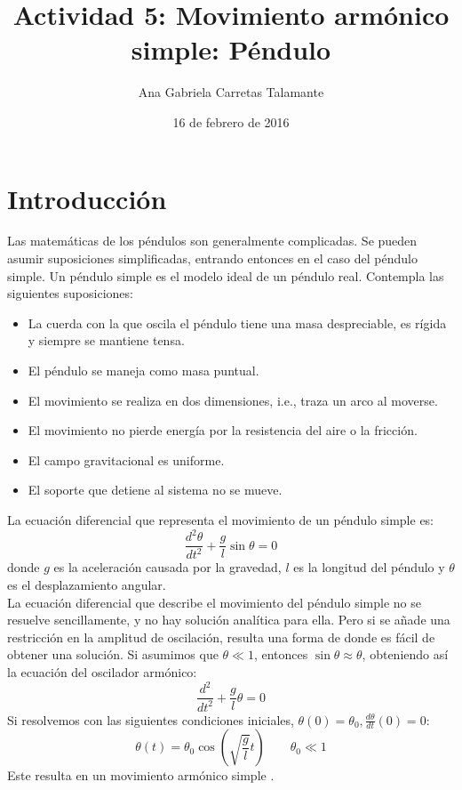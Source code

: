 \documentclass[12pt]{article}
\title{Actividad 5: Movimiento armónico simple: Péndulo}
\author{Ana Gabriela Carretas Talamante}
\date{16 de febrero de 2016}
\begin{document}
\maketitle
\section{Introducción}
Las matemáticas de los péndulos son generalmente complicadas. Se pueden asumir suposiciones simplificadas, entrando entonces en el caso del péndulo simple. Un péndulo simple es el modelo ideal de un péndulo real. Contempla las siguientes suposiciones:
\begin{itemize}
\item La cuerda con la que oscila el péndulo tiene una masa despreciable, es rígida y siempre se mantiene tensa.
\item El péndulo se maneja como masa puntual.
\item El movimiento se realiza en dos dimensiones, i.e., traza un arco al moverse.
\item El movimiento no pierde energía por la resistencia del aire o la fricción.
\item El campo gravitacional es uniforme.
\item El soporte que detiene al sistema no se mueve.
\end{itemize}
La ecuación diferencial que representa el movimiento de un péndulo simple es:
\begin{equation}
\label{1}
\frac{d^2\theta}{dt^2} + \frac{g}{l}\sin\theta=0
\end{equation}
donde $g$ es la aceleración causada por la gravedad, $l$ es la longitud del péndulo y $\theta$ es el desplazamiento angular. \\

La ecuación diferencial que describe el movimiento del péndulo simple no se resuelve sencillamente, y no hay solución analítica para ella. Pero si se añade una restricción en la amplitud de oscilación, resulta una forma de donde es fácil de obtener una solución. Si asumimos que $\theta \ll 1$, entonces $\sin\theta\approx\theta$, obteniendo así la ecuación del oscilador armónico:
\begin{equation}
\frac{d^2}{dt^2}+\frac{g}{l}\theta=0
\end{equation}
Si resolvemos con las siguientes condiciones iniciales, $\theta(0)=\theta_0, \frac{d\theta}{dt}(0)=0$:
\begin{equation}
\theta(t)=\theta_0\cos\left(\sqrt{\frac{g}{l}}t\right) \qquad \theta_0\ll1
\end{equation}
Este resulta en un movimiento armónico simple \cite{W}. \\
\end{document}

